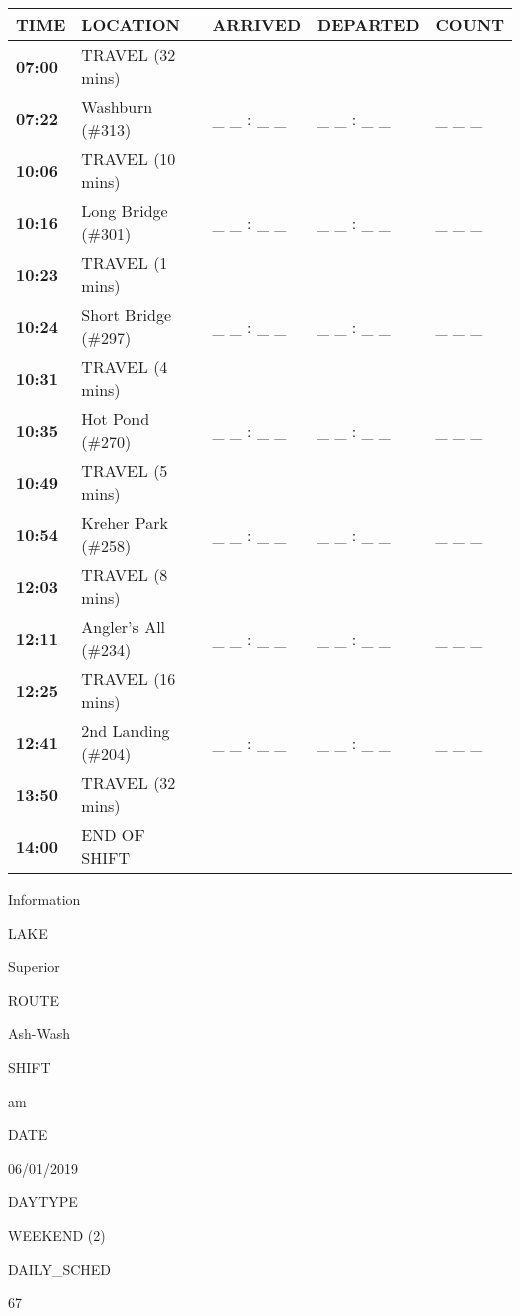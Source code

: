 \documentclass[]{article}
\begin{document}
\begin{tabular}{>{\bfseries}lllll}
\toprule
\textbf{TIME} & \textbf{LOCATION} & \textbf{ARRIVED} & \textbf{DEPARTED} & \textbf{COUNT}\\
\midrule
07:00 & TRAVEL (32 mins) &  &  & \\
07:22 & Washburn (\#313) & \_ \_ : \_ \_ & \_ \_ : \_ \_ & \_ \_ \_\\
10:06 & TRAVEL (10 mins) &  &  & \\
10:16 & Long Bridge (\#301) & \_ \_ : \_ \_ & \_ \_ : \_ \_ & \_ \_ \_\\
10:23 & TRAVEL (1 mins) &  &  & \\
10:24 & Short Bridge (\#297) & \_ \_ : \_ \_ & \_ \_ : \_ \_ & \_ \_ \_\\
10:31 & TRAVEL (4 mins) &  &  & \\
10:35 & Hot Pond (\#270) & \_ \_ : \_ \_ & \_ \_ : \_ \_ & \_ \_ \_\\
10:49 & TRAVEL (5 mins) &  &  & \\
10:54 & Kreher Park (\#258) & \_ \_ : \_ \_ & \_ \_ : \_ \_ & \_ \_ \_\\
12:03 & TRAVEL (8 mins) &  &  & \\
12:11 & Angler's All (\#234) & \_ \_ : \_ \_ & \_ \_ : \_ \_ & \_ \_ \_\\
12:25 & TRAVEL (16 mins) &  &  & \\
12:41 & 2nd Landing (\#204) & \_ \_ : \_ \_ & \_ \_ : \_ \_ & \_ \_ \_\\
13:50 & TRAVEL (32 mins) &  &  & \\
14:00 & END OF SHIFT &  &  & \\
\bottomrule
\end{tabular}\newpage

Information

LAKE

Superior

ROUTE

Ash-Wash

SHIFT

am

DATE

06/01/2019

DAYTYPE

WEEKEND (2)

DAILY\_SCHED

67

\vspace{24pt}
\end{document}
